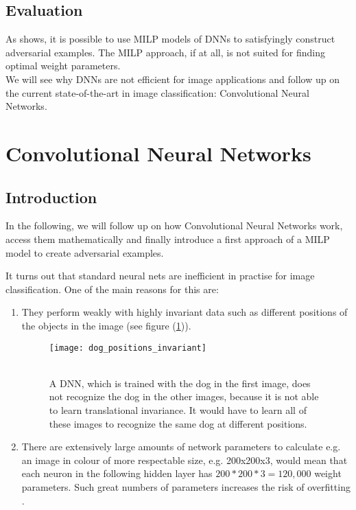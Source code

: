 \documentclass{article}
\begin{document}
\subsection{Evaluation}

As \cite{fischetti17} shows, it is possible to use MILP models of DNNs to satisfyingly construct adversarial examples. The MILP approach, if at all, is not suited for finding optimal weight parameters.\\
We will see why DNNs are not efficient for image applications and follow up on the current state-of-the-art in image classification: Convolutional Neural Networks.



\newpage
\section{Convolutional Neural Networks}

\subsection{Introduction}

In the following, we will follow up on how Convolutional Neural Networks work, access them mathematically and finally introduce a first approach of a MILP model to create adversarial examples.  


It turns out that standard neural nets are inefficient in practise for image classification. One of the main reasons for this are:
\begin{enumerate}
\item They perform weakly with highly invariant data such as different positions of the objects in the image \citep{cs231:optimizers} (see figure (\ref{dog1 image})).


\begin{figure}[!htb]
\vskip 0.2in
\begin{center}
\centerline{\texttt{[image: dog\_positions\_invariant]}}
\caption{\cite{kaggle}\label{translational_dog}\\
A DNN, which is trained with the dog in the first image, does not recognize the dog in the other images, because it is not able to learn translational invariance. It would have to learn all of these images to recognize the same dog at different positions.}
\label{dog1 image}
\end{center}
\vskip -0.2in
\end{figure}

\medskip

\item There are extensively large amounts of network parameters to calculate e.g. an image in colour of more respectable size, e.g. 200x200x3, would mean that each neuron in the following hidden layer has $200*200*3=120,000$ weight parameters. Such great numbers of parameters increases the risk of overfitting \cite{cs231:optimizers}. 
\end{enumerate} 
\end{document}
